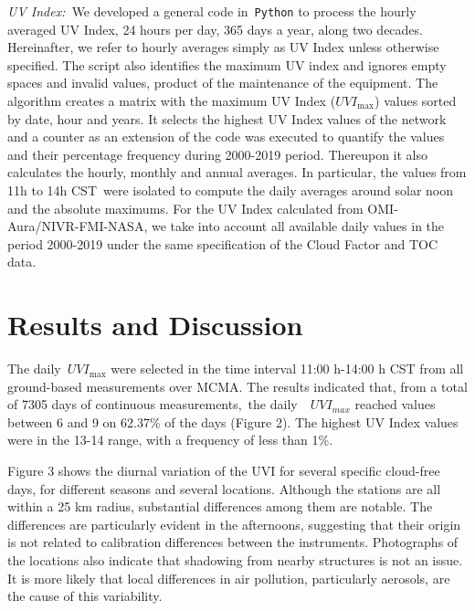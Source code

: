 \documentclass{article}
\begin{document}
{\emph{UV Index:~}We developed a general code in~\texttt{Python} to
process the hourly averaged UV Index, 24 hours per day, 365 days a year,
along two decades. Hereinafter, we refer to hourly averages simply as UV
Index unless otherwise specified. The script also identifies the maximum
UV index and ignores empty spaces and invalid values, product of the
maintenance of the equipment. The algorithm creates a matrix with the
maximum UV Index (\(UVI_{\max}\)) values sorted by date, hour and
years. It selects the highest UV Index values of the network and a
counter as an extension of the code was executed to quantify the values
and their percentage frequency during 2000-2019 period. Thereupon it
also calculates the hourly, monthly and annual averages. In particular,
the values from 11h to 14h CST~were isolated to compute the daily
averages around solar noon and the absolute maximums. For the UV Index
calculated from OMI-Aura/NIVR-FMI-NASA, we take into account all
available daily values in the period 2000-2019 under the same
specification of the Cloud Factor and TOC data.

\section*{Results and Discussion}


The daily~\(UVI_{\max}\) were selected in the time interval 11:00
h-14:00 h CST from all ground-based measurements over MCMA. The results
indicated that, from a total of 7305 days of continuous
measurements,~the daily~~\(UVI_{max}\) reached values between 6 and
9 on 62.37\% of the days (Figure 2).%
The highest UV Index values were in the 13-14 range, with a frequency of
less than 1\%.

Figure 3 %
shows the diurnal variation of
the UVI for several specific cloud-free days, for different seasons and
several locations. Although the stations are all within a 25 km radius,
substantial differences among them are notable. The differences are
particularly evident in the afternoons, suggesting that their origin is
not related to calibration differences between the instruments.
Photographs of the locations also indicate that shadowing from nearby
structures is not an issue. It is more likely that local differences in
air pollution, particularly aerosols, are the cause of this variability.

}
\end{document}
